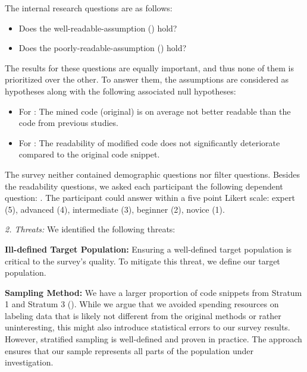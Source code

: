 \documentclass[%
class=scrreprt,
chapterprefix=false,%
open=right,%
twoside=false,%
paper=a4,%
logofile={Logo\_zentral\_farbig\_EN.png},%
thesistype=master,%
UKenglish,%
]{se2thesis}
\theoremstyle{definition}
\begin{document}
	The internal research questions are as follows:
	\begin{itemize}
		\item Does the well-readable-assumption () hold?
		\item Does the poorly-readable-assumption () hold?
	\end{itemize}
	
	The results for these questions are equally important, and thus none of them is prioritized over the other.
	To answer them, the assumptions	are considered as hypotheses along with the following associated null hypotheses:
	\begin{itemize}
		\item For : The mined code (original) is on average not better readable than the code from previous studies.
		\item For : The readability of modified code does not significantly deteriorate compared to the original code snippet.
	\end{itemize}
	
	The survey neither contained demographic questions nor filter questions. Besides the readability questions, we asked each participant the following dependent question: . The participant could answer within a five point Likert scale: expert (5), advanced (4), intermediate (3), beginner (2), novice (1).
	
\textit{2. Threats:}
	We identified the following threats:

	\textbf{Ill-defined Target Population:} Ensuring a well-defined target population is critical to the survey's quality. To mitigate this threat, we define our target population.
	
	\textbf{Sampling Method:} We have a larger proportion of code snippets from Stratum 1 and Stratum 3 (). While we argue that we avoided spending resources on labeling data that is likely not different from the original methods or rather uninteresting, this might also introduce statistical errors to our survey results.
	However, stratified sampling is well-defined and proven in practice. The approach ensures that our sample represents all parts of the population under investigation.
	
\end{document}
